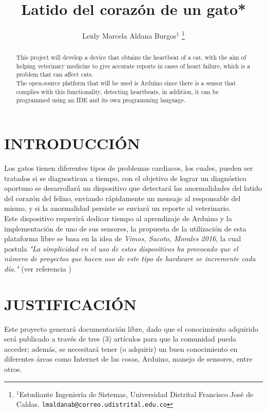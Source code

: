 \documentclass[letterpaper, 10 pt, conference]{ieeeconf}  %
\title{\LARGE \bf
Latido del coraz\'on de un gato*
}
\author{Leidy Marcela Aldana Burgos$^{1}$ %
\thanks{$^{1}$Estudiante Ingenier\'ia de Sistemas,
        Universidad Distrital Francisco Jos\'e de Caldas.
        {\tt\small lmaldanab@correo.udistrital.edu.co}}%
}
\begin{document}
\maketitle
\thispagestyle{empty}
\pagestyle{empty}


\begin{abstract}

This project will develop a device that obtains the heartbeat of a cat, with the aim of helping veterinary medicine to give accurate reports in cases of heart failure, which is a problem that can affect cats.\\

The open-source platform that will be used is Arduino since there is a sensor that complies with this functionality, detecting heartbeats, in addition, it can be programmed using an IDE and its own programming language.

\end{abstract}


\section{INTRODUCCI\'ON}

Los gatos tienen diferentes tipos de problemas cardiacos, los cuales, pueden ser tratados si se diagnostican a tiempo, con el objetivo de lograr un diagn\'ostico oportuno se desarrollar\'a un dispositivo que detectar\'a las anormalidades del latido del coraz\'on del felino, enviando r\'apidamente un mensaje al responsable del mismo, y si la anormalidad persiste se enviar\'a un reporte al veterinario.
\\

Este dispositivo requerir\'a dedicar tiempo al aprendizaje de Arduino y la implementaci\'on de uno de sus sensores, la propuesta de la utilizaci\'on de esta plataforma libre se basa en la idea de \textit{Vimos, Sacoto, Morales 2016}, la cual postula \textit{"La simplicidad en el uso de estos dispositivos ha provocado que el n\'umero de proyectos que hacen uso de este tipo de hardware se incremente cada d\'ia."} (ver referencia \cite{c1})

\section{JUSTIFICACI\'ON}

Este proyecto generar\'a documentaci\'on libre, dado que el conocimiento adquirido ser\'a publicado a trav\'es de tres (3) art\'iculos para que la comunidad pueda acceder; adem\'as, se necesitar\'a tener (o adquirir) un buen conocimiento en diferentes \'areas como Internet de las cosas, Arduino, manejo de sensores, entre otros.
\end{document}
